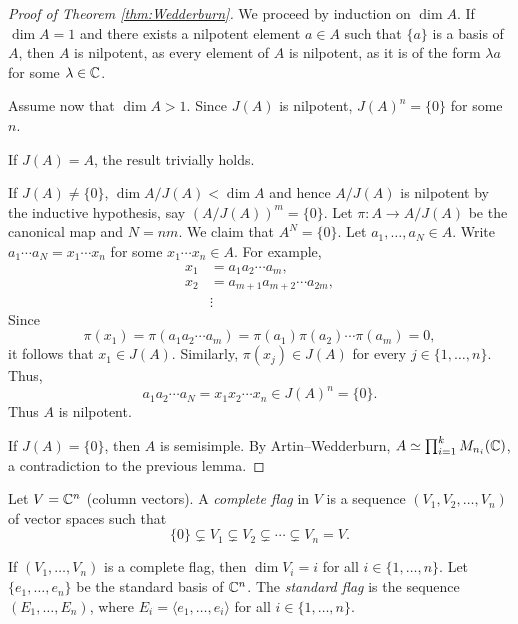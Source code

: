 \begin{proof}[Proof of Theorem \ref{thm:Wedderburn}]
    We proceed by induction on $\dim A$. If $\dim A=1$ and 
    there exists a nilpotent element $a\in A$ such that 
    $\{a\}$ is a basis of $A$, then $A$ is nilpotent, 
    as every element of $A$ is nilpotent, as it is 
    of the form 
    $\lambda a$ for some $\lambda\in\mathbb{C}$. 
    
    Assume now that $\dim A>1$. Since $J(A)$ is nilpotent, $J(A)^n=\{0\}$ 
    for some $n$. 
    
    If $J(A)=A$, the result trivially holds. 

    If $J(A)\ne\{0\}$, 
    $\dim A/J(A)<\dim A$ and hence 
    $A/J(A)$ is nilpotent by 
    the inductive hypothesis, 
    say $(A/J(A))^m=\{0\}$. Let $\pi\colon A\to A/J(A)$ be the canonical map and 
    $N=nm$. We claim that $A^N=\{0\}$. Let $a_1,\dots,a_N\in A$. Write
    $a_1\cdots a_N=x_1\cdots x_n$ for some $x_1\cdots x_n\in A$. For example,
    \begin{align*}
    x_1&=a_1a_2\cdots a_m,\\
    x_2&=a_{m+1}a_{m+2}\cdots a_{2m},\\
    &\vdots
    \end{align*}
    Since 
    \[
    \pi(x_1)=\pi(a_1a_2\cdots a_m)=\pi(a_1)\pi(a_2)\cdots\pi(a_m)=0,
    \]
    it follows that $x_1\in J(A)$. Similarly, 
    $\pi(x_j)\in J(A)$
    for every $j\in\{1,\dots,n\}$. Thus,
    \[
    a_1a_2\cdots a_N=x_1x_2\cdots x_n\in J(A)^n=\{0\}. 
    \]
    Thus $A$ is nilpotent. 

    If $J(A)=\{0\}$, then 
    $A$ is semisimple. By Artin--Wedderburn, 
    $A\simeq\prod_{i=1}^k M_{n_i}(\mathbb{C})$, a contradiction to 
    the previous lemma. 
\end{proof}

\begin{definition}
    Let $V=\mathbb{C}^{n}$ (column vectors). A \emph{complete flag} in $V$ 
    is a sequence $(V_1,V_2,\dots,V_n)$ of vector spaces
    such that 
    \[
    \{0\}\subsetneq V_1\subsetneq V_2\subsetneq\cdots\subsetneq V_n=V.
    \]
\end{definition}

If $(V_1,\dots,V_n)$ is a complete flag, then $\dim V_i=i$ for all 
$i\in\{1,\dots,n\}$. 
Let $\{e_1,\dots,e_n\}$ be the standard basis of $\mathbb{C}^n$. 
The \emph{standard flag} is the sequence $(E_1,\dots,E_n)$, where
$E_i=\langle e_1,\dots,e_i\rangle$ for all $i\in\{1,\dots,n\}$.  

